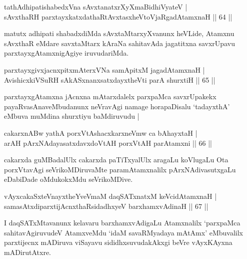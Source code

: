 
\begin{shl}
tathA\s dhipatishabedxVna sAvxtanatxrXyXmaBidhiVyateV |\\
sAvxthaRH parxtayxkatxdathaRtAvxtasxheVtoVjaRgadAtamxnaH \hfill || 64 ||
\end{shl}	

\begin{artha}
matutx adhipati shabadxdiMda sAvxtaMtarxyXvanunx heVLide, Atamxnu sAvxthaR eMdare savxtaMtarx kAraNa sahitavAda jagatitxna savxrUpavu parxtayxgAtamxnigAgiye iruvudariMda.
\end{artha}


\begin{shl}
parxtayxgivxjacnxpitxmAterxVNa samApitxM jagadAtamxnaH |\\
AvishicxkiVSuRH sAkASxnanxsatxdayxtheVti parA shurxtiH \hfill || 65 ||
\end{shl}

\begin{artha}
parxtayxgAtamxna jAcnxna mAtarxdalelx parxpaMca savxrUpakekx
payaRvasAnaveMbudanunx neVravAgi namage horapaDisalu `tadayxthA' eMbuva
muMdina shurxtiyu baMdiruvudu |
\end{artha}

\begin{shl}
cakarxnABw yathA porxVtAshacxkarxneVmw ca bAhayxtaH |\\
arAH pArxNAdayasatxdavxdoVtAH porxVtAH parAtamxni \hfill || 66 ||
\end{shl}

\begin{artha}
cakarxda guMBadalUlx cakarxda paTiTxyalUlx aragaLu koVlugaLu Ota porxVtavAgi seVrikoMDiruvaMte paramAtamxnalilx pArxNAdivasutxgaLu eDabiDade oMdukokxMdu seVrikoMDive.
\end{artha}


\begin{shl}
vAyxcakaSxteV\s nayxtheYveVmaM daqSATxnatxM keVcidAtamxnaH |\\
samasAtxdiparxtijAcnxthaRsidadhxyeV barxhamxvAdinaH \hfill || 67 ||
\end{shl}

\begin{artha}
I daqSATxMtavanunx kelavaru barxhamxvAdigaLu Atamxnalilx `parxpaMca sahitavAgi\-ruvudeV AtamxveMdu `idaM savaRMyadaya mAtAmx' eMbuvalilx parxtijecnx mADiruva viSayavu sididhxsuvudakAkxgi beVre vAyxKAyxna mADirutAtxre.
\end{artha}

